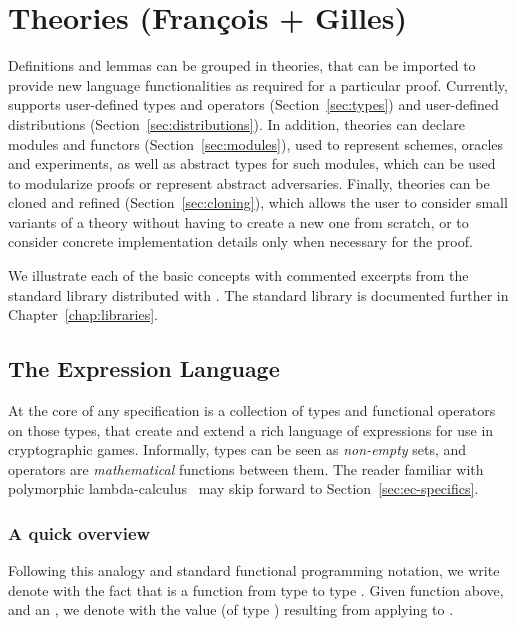 
\chapter{Theories (Fran\c{c}ois + Gilles)\label{chap:theories}}

Definitions and lemmas can be grouped in theories, that can be imported to
provide new language functionalities as required for a particular proof.
Currently, \EC supports user-defined types and operators
(Section~\ref{sec:types}) and user-defined distributions
(Section~\ref{sec:distributions}). In addition, theories can declare modules and
functors (Section~\ref{sec:modules}), used to represent schemes, oracles and
experiments, as well as abstract types for such modules, which can be used to
modularize proofs or represent abstract adversaries. Finally, theories can be
cloned and refined (Section~\ref{sec:cloning}), which allows the user to
consider small variants of a theory without having to create a new one from
scratch, or to consider concrete implementation details only when necessary for
the proof.

We illustrate each of the basic concepts with commented excerpts from the
standard library distributed with \EC. The standard library is documented
further in Chapter~\ref{chap:libraries}.

\section{The \EC Expression Language}

At the core of any \EC specification is a collection of types and functional
operators on those types, that create and extend a rich language of expressions
for use in cryptographic games. Informally, \EC types can be seen as
\emph{non-empty} sets, and operators are \emph{mathematical} functions between
them.
%
The reader familiar with polymorphic lambda-calculus~\cite{} may skip forward to
Section~\ref{sec:ec-specifics}.

\subsection{A quick overview}
Following this analogy and standard functional programming notation, we write
denote with   the fact that  is a function from
type  to type . Given function  above, and an
, we denote with  the value (of type )
resulting from applying  to .

